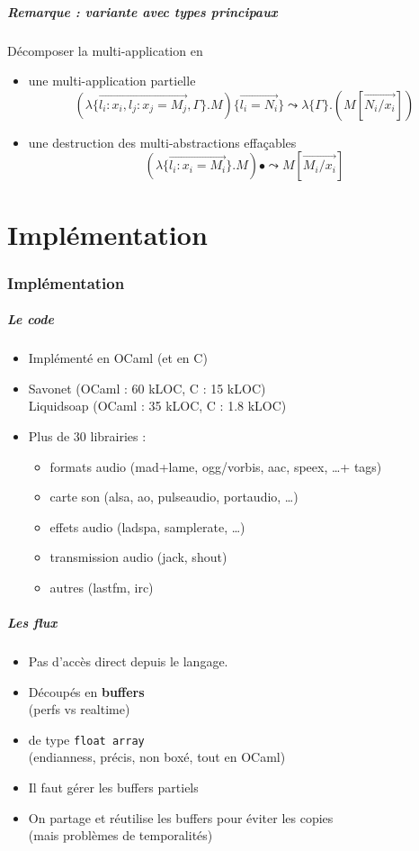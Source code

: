\documentclass{beamer}
\newcommand{\mabs}[2]{\lambda\{#1\}.#2}
\newcommand{\mapp}[2]{#1\{#2\}}
\renewcommand{\vec}[1]{\overrightarrow{#1}}
\newcommand{\partie}[1]{\part{#1}\section{#1}\frame{\partpage}}
\begin{document}
\begin{frame}
  \frametitle{Remarque : variante avec types principaux}

  Décomposer la multi-application en
  \begin{itemize}
  \item une multi-application partielle
    \[
    \mapp{(\mabs{\vec{l_i:x_i,l_j:x_j=M_j},\Gamma}{M})}{\vec{l_i=N_i}}
    \leadsto
    \lambda\{\Gamma\}.(M[\vec{N_i/x_i}])
    \]
  \item une destruction des multi-abstractions effaçables
    \[
    (\mabs{\vec{l_i:x_i=M_i}}{M})\bullet
    \leadsto
    M[\vec{M_i/x_i}]
    \]
  \end{itemize}
\end{frame}

\partie{Implémentation}

\begin{frame}
  \frametitle{Le code}

  \begin{itemize}
  \item Implémenté en OCaml (et en C)
  \item Savonet (OCaml : 60 kLOC, C : 15 kLOC)\\
    Liquidsoap (OCaml : 35 kLOC, C : 1.8 kLOC)
  \item Plus de 30 librairies :
    \begin{itemize}
    \item formats audio (mad+lame, ogg/vorbis, aac, speex, \ldots + tags)
    \item carte son (alsa, ao, pulseaudio, portaudio, \ldots)
    \item effets audio (ladspa, samplerate, \ldots)
    \item transmission audio (jack, shout)
    \item autres (lastfm, irc)
    \end{itemize}
  \end{itemize}
\end{frame}

\begin{frame}
  \frametitle{Les flux}

  \begin{itemize}
  \item Pas d'accès direct depuis le langage.
  \item Découpés en \textbf{buffers}\\
    (perfs vs realtime)
  \item de type \texttt{float array}\\
    (endianness, précis, non boxé, tout en OCaml)
  \item Il faut gérer les buffers partiels
  \item On partage et réutilise les buffers pour éviter les copies\\
    (mais problèmes de temporalités)
  \end{itemize}
\end{frame}
\end{document}
